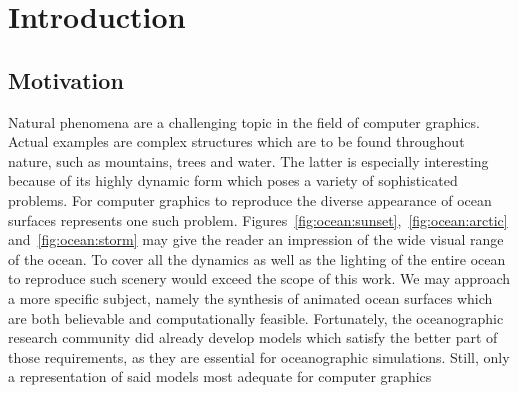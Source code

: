 \chapter{Introduction}
\label{ch:intro}
%
\section{Motivation}
\label{sec:motivation}
Natural phenomena are a challenging topic in the field of computer graphics.
Actual examples are complex structures which are to be found throughout nature,
such as mountains, trees and water. The latter is especially interesting
because of its highly dynamic form which poses a variety of sophisticated problems.
For computer graphics to reproduce the diverse appearance of ocean surfaces
represents one such problem.
Figures~\ref{fig:ocean:sunset},~\ref{fig:ocean:arctic} and~\ref{fig:ocean:storm}
may give the reader an impression of the wide visual range of the ocean.
To cover all the dynamics as well as the lighting of the entire ocean to
reproduce such scenery would exceed the scope of this work.
We may approach a more specific subject, namely the synthesis of animated ocean
surfaces which are both believable and computationally feasible.
Fortunately, the oceanographic research community did already develop models
which satisfy the better part of those requirements, as they are essential for
oceanographic simulations.
Still, only a representation of said models most adequate for computer graphics
